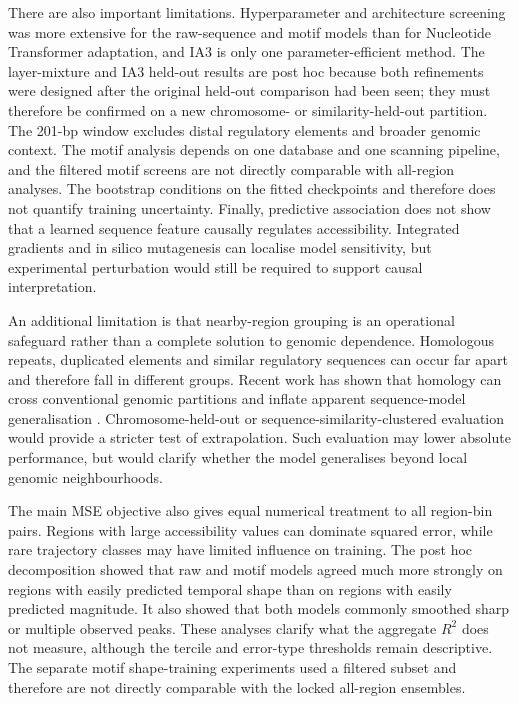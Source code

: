 \documentclass[a4paper,12pt]{article}
\begin{document}
There are also important limitations. Hyperparameter and architecture screening was more extensive for the raw-sequence and motif models than for Nucleotide Transformer adaptation, and IA3 is only one parameter-efficient method. The layer-mixture and IA3 held-out results are post hoc because both refinements were designed after the original held-out comparison had been seen; they must therefore be confirmed on a new chromosome- or similarity-held-out partition. The 201-bp window excludes distal regulatory elements and broader genomic context. The motif analysis depends on one database and one scanning pipeline, and the filtered motif screens are not directly comparable with all-region analyses. The bootstrap conditions on the fitted checkpoints and therefore does not quantify training uncertainty. Finally, predictive association does not show that a learned sequence feature causally regulates accessibility. Integrated gradients and in silico mutagenesis can localise model sensitivity, but experimental perturbation would still be required to support causal interpretation.

An additional limitation is that nearby-region grouping is an operational safeguard rather than a complete solution to genomic dependence. Homologous repeats, duplicated elements and similar regulatory sequences can occur far apart and therefore fall in different groups. Recent work has shown that homology can cross conventional genomic partitions and inflate apparent sequence-model generalisation \citep{rafi2025leakage}. Chromosome-held-out or sequence-similarity-clustered evaluation would provide a stricter test of extrapolation. Such evaluation may lower absolute performance, but would clarify whether the model generalises beyond local genomic neighbourhoods.

The main MSE objective also gives equal numerical treatment to all region-bin pairs. Regions with large accessibility values can dominate squared error, while rare trajectory classes may have limited influence on training. The post hoc decomposition showed that raw and motif models agreed much more strongly on regions with easily predicted temporal shape than on regions with easily predicted magnitude. It also showed that both models commonly smoothed sharp or multiple observed peaks. These analyses clarify what the aggregate $R^2$ does not measure, although the tercile and error-type thresholds remain descriptive. The separate motif shape-training experiments used a filtered subset and therefore are not directly comparable with the locked all-region ensembles.
\end{document}
